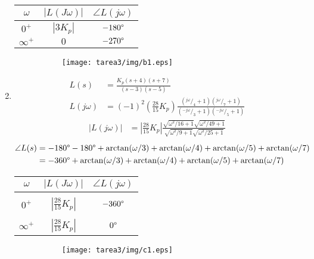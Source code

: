\begin{ejercicio}
\begin{enumerate}
      \begin{center}
        \begin{tabular}{c | c c}
          $\omega$ & $|L(J\omega)|$ & $\angle L(j\omega)$
          \\ \hline 
          $0^+$ & $|3K_p|$ & $-180\degree$
          \\
          $\infty^+$ & $0$ & $-270\degree$
        \end{tabular}
      \end{center}
      \begin{figure}[H]
        \centering
        \begin{subfigure}{0.65\textwidth}
        \centering
          \texttt{[image: tarea3/img/b1.eps]}
        \end{subfigure}
      \end{figure}
    
    \item
      \begin{align*}
        L(s) &= \frac{K_p(s+4)(s+7)}{(s-3)(s-5)} 
        \\
        L(j\omega) &= (-1)^2\left(\frac{28}{15}K_p\right)
          \frac
            {(^{j\omega}/_4+1)(^{j\omega}/_7+1)}
            {(^{-j\omega}/_3+1)(^{-j\omega}/_5+1)}
      \end{align*}
      \begin{align*}
        \left|L(j\omega)\right| &= \left|\frac{28}{15}K_p\right| 
          \frac
            {\sqrt{\omega^2/16 + 1}\sqrt{\omega^2/49 + 1}}
            {\sqrt{\omega^2/9 + 1}\sqrt{\omega^2/25 + 1}}
      \end{align*}
      \begin{align*}
        \angle L(s) &= -180\degree -180\degree + \arctan(\omega/3) + \arctan(\omega/4) + \arctan(\omega/5) + \arctan(\omega/7)
        \\
        &= - 360\degree + \arctan(\omega /3) + \arctan(\omega /4) + \arctan(\omega /5) + \arctan(\omega /7)
      \end{align*}

      \begin{center}
        \begin{tabular}{c | c c}
          $\omega$ & $|L(J\omega)|$ & $\angle L(j\omega)$
          \\ \hline \\
          $0^+$ & $\left|\frac{28}{15}K_p\right|$ & $-360\degree$
          \\\\
          $\infty^+$ & $\left|\frac{28}{15}K_p\right|$ & $0\degree$
        \end{tabular}
      \end{center}
      \begin{figure}[H]
        \centering
        \begin{subfigure}{0.65\textwidth}
        \centering
          \texttt{[image: tarea3/img/c1.eps]}
        \end{subfigure}
      \end{figure}


\end{enumerate}
\end{ejercicio}
